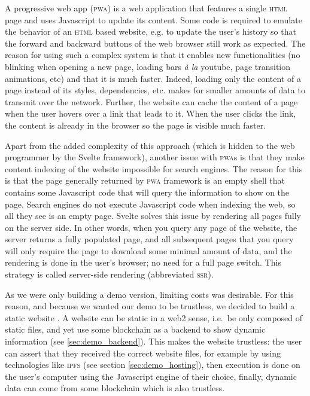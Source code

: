 A progressive web app (\textsc{pwa}) is a web application that features a single \textsc{html} page and uses Javascript to update its content.
Some code is required to emulate the behavior of an \textsc{html} based website, e.g. to update the user's history so that the forward and backward buttons of the web browser still work as expected.
The reason for using such a complex system is that it enables new functionalities (no blinking when opening a new page, loading bars \emph{à la} youtube, page transition animations, etc) and that it is much faster.
Indeed, loading only the content of a page instead of its styles, dependencies, etc. makes for smaller amounts of data to transmit over the network.
Further, the website can cache the content of a page when the user hovers over a link that leads to it.
When the user clicks the link, the content is already in the browser so the page is visible much faster.

Apart from the added complexity of this approach (which is hidden to the web programmer by the Svelte framework), another issue with \textsc{pwa}s is that they make content indexing of the website impossible for search engines.
The reason for this is that the page generally returned by \textsc{pwa} framework is an empty shell that contains some Javascript code that will query the information to show on the page.
Search engines do not execute Javascript code when indexing the web, so all they see is an empty page.
Svelte solves this issue by rendering all pages fully on the server side.
In other words, when you query any page of the website, the server returns a fully populated page, and all subsequent pages that you query will only require the page to download some minimal amount of data, and the rendering is done in the user's browser; no need for a full page switch.
This strategy is called server-side rendering (abbreviated \textsc{ssr}).

As we were only building a demo version, limiting costs was desirable.
For this reason, and because we wanted our demo to be trustless, we decided to build a static website%
.
A website can be static in a web2 sense, i.e.\ be only composed of static files, and yet use some blockchain as a backend to show dynamic information (see \cref{sec:demo_backend}).
This makes the website trustless: the user can assert that they received the correct website files, for example by using technologies like \textsc{ipfs} (see section \cref{sec:demo_hosting}), then execution is done on the user's computer using the Javascript engine of their choice, finally, dynamic data can come from some blockchain which is also trustless.

